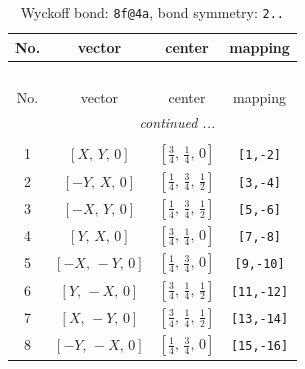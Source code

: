 \documentclass[fleqn,8pt]{jsarticle}
\begin{document}
\begin{longtable}{cccc}
\caption{Wyckoff bond: {\tt 8f@4a}, bond symmetry: {\tt 2..}}
 \\
 \hline \hline
No. & vector & center & mapping \\ \hline \endfirsthead

\multicolumn{3}{l}{\tablename\ \thetable{}} \\
 \hline \hline
No. & vector & center & mapping \\ \hline \endhead

 \hline \hline
\multicolumn{3}{r}{\footnotesize\it continued ...} \\ \endfoot

 \hline \hline
\multicolumn{3}{r}{} \\ \endlastfoot

1 & $\left[ X,\, Y,\, 0 \right]$ & $\left[ \frac{3}{4},\, \frac{1}{4},\, 0 \right]$ & {\tt [1,-2]} \\ \hline
2 & $\left[ - Y,\, X,\, 0 \right]$ & $\left[ \frac{1}{4},\, \frac{3}{4},\, \frac{1}{2} \right]$ & {\tt [3,-4]} \\ \hline
3 & $\left[ - X,\, Y,\, 0 \right]$ & $\left[ \frac{1}{4},\, \frac{3}{4},\, \frac{1}{2} \right]$ & {\tt [5,-6]} \\ \hline
4 & $\left[ Y,\, X,\, 0 \right]$ & $\left[ \frac{3}{4},\, \frac{1}{4},\, 0 \right]$ & {\tt [7,-8]} \\ \hline
5 & $\left[ - X,\, - Y,\, 0 \right]$ & $\left[ \frac{1}{4},\, \frac{3}{4},\, 0 \right]$ & {\tt [9,-10]} \\ \hline
6 & $\left[ Y,\, - X,\, 0 \right]$ & $\left[ \frac{3}{4},\, \frac{1}{4},\, \frac{1}{2} \right]$ & {\tt [11,-12]} \\ \hline
7 & $\left[ X,\, - Y,\, 0 \right]$ & $\left[ \frac{3}{4},\, \frac{1}{4},\, \frac{1}{2} \right]$ & {\tt [13,-14]} \\ \hline
8 & $\left[ - Y,\, - X,\, 0 \right]$ & $\left[ \frac{1}{4},\, \frac{3}{4},\, 0 \right]$ & {\tt [15,-16]} \\
\end{longtable}
\renewcommand{\arraystretch}{1.2}
\end{document}
